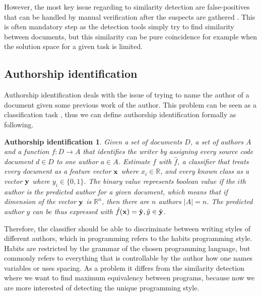 However, the most key issue regarding to similarity detection are false-positives that can be handled by manual verification after the suspects are gathered \cite{ Roy:2009:CEC:1530898.1531101, Verco:1996:SDS:369585.369598}. This is often mandatory step as the detection tools simply try to find similarity between documents, but this similarity can be pure coincidence for example when the solution space for a given task is limited. 



\subsection{Authorship identification} \label{chap-ai}

Authorship identification deals with the issue of trying to name the author of a document given some previous work of the author. This problem can be seen as a classification task \cite{KRSUL1997233}, thus we can define authorship identification formally as following.

\newtheorem*{aui1}{Authorship identification}
\begin{aui1}
Given a set of documents $D$, a set of authors $A$ and a function $f: D \rightarrow A$ that identifies the writer by assigning every source code document $d \in D$ to one author $a \in A$. Estimate $f$ with $\hat{f}$, a classifier that treats every document as a feature vector $\mathbf{x}$ where $x_i \in \mathbb{R}$, and every known class as a vector $\mathbf{y}$ where $y_i \in \{0, 1\}$. The binary value represents boolean value if the $i$th author is the predicted author for a given document, which means that if dimension of the vector $\mathbf{y}$ is $\mathbb{R}^n$, then there are $n$ authors $|A| = n$. The predicted author $\hat{y}$ can be thus expressed with $\hat{f}(\mathbf{x}) = \hat{\mathbf{y}}, \hat{y} \in \hat{\mathbf{y}}$.
\end{aui1}

Therefore, the classifier should be able to discriminate between writing styles of different authors, which in programming refers to the habits \ie programming style. Habits are restricted by the grammar of the chosen programming language, but commonly refers to everything that is controllable by the author \eg how one names variables or uses spacing. As a problem it differs from the similarity detection where we want to find maximum equivalency between programs, because now we are more interested of detecting the unique programming style.  

